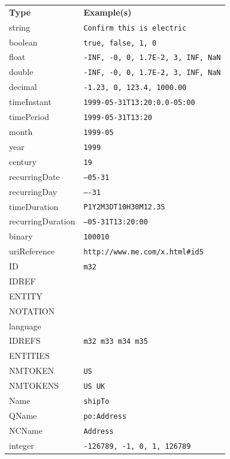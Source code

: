\documentclass[10pt]{article}
\begin{document}
\begin{figure}
  \centering
  \small
  \begin{tabular}{@{}ll@{}}
    \textbf{Type} & \textbf{Example(s)} \\
         string		& \texttt{Confirm this is electric} \\
         boolean 	& \texttt{true, false, 1, 0} \\
         float		& \texttt{-INF, -0, 0, 1.7E-2, 3, INF, NaN} \\
         double		& \texttt{-INF, -0, 0, 1.7E-2, 3, INF, NaN} \\
         decimal	& \texttt{-1.23, 0, 123.4, 1000.00} \\
         timeInstant	& \texttt{1999-05-31T13:20:0.0-05:00} \\
         timePeriod	& \texttt{1999-05-31T13:20} \\
         month		& \texttt{1999-05} \\
         year		& \texttt{1999} \\
         century	& \texttt{19} \\
         recurringDate	& \texttt{--05-31} \\
         recurringDay	& \texttt{----31} \\
         timeDuration	& \texttt{P1Y2M3DT10H30M12.3S} \\
         recurringDuration	& \texttt{--05-31T13:20:00} \\
         binary		& \texttt{100010} \\
         uriReference	& \texttt{http://www.me.com/x.html\#id5} \\
         ID             & \texttt{m32} \\
         IDREF \\
         ENTITY \\
         NOTATION \\
         language \\
         IDREFS         & \texttt{m32 m33 m34 m35} \\
         ENTITIES \\
         NMTOKEN 	& \texttt{US} \\
         NMTOKENS		& \texttt{US UK} \\
         Name		& \texttt{shipTo} \\
         QName		& \texttt{po:Address} \\
         NCName		& \texttt{Address} \\
         integer		& \texttt{-126789, -1, 0, 1, 126789} \\

\end{tabular}
\end{figure}
\end{document}
